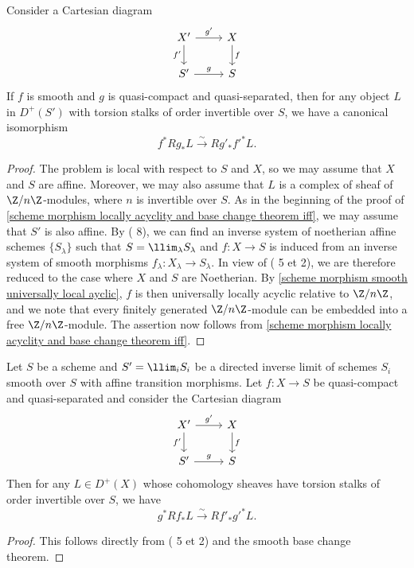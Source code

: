 \begin{theorem}
Consider a Cartesian diagram
\[\begin{tikzcd}
X'\ar[r,"g'"]\ar[d,swap,"f'"]&X\ar[d,"f"]\\
S'\ar[r,"g"]&S
\end{tikzcd}\]
If $f$ is smooth and $g$ is quasi-compact and quasi-separated, then for any object $L$ in $D^+(S')$ with torsion stalks of order invertible over $S$, we have a canonical isomorphism
\[f^*Rg_*L\stackrel{\sim}{\to} Rg'_*f'^*L.\]
\end{theorem}
\begin{proof}
The problem is local with respect to $S$ and $X$, so we may assume that $X$ and $S$ are affine. Moreover, we may also assume that $L$ is a complex of sheaf of $\Z/n\Z$-modules, where $n$ is invertible over $S$. As in the beginning of the proof of \cref{scheme morphism locally acyclity and base change theorem iff}, we may assume that $S'$ is also affine. By (\cite{EGA4-3} 8), we can find an inverse system of noetherian affine schemes $\{S_\lambda\}$ such that $S=\llim_\lambda S_\lambda$ and $f:X\to S$ is induced from an inverse system of smooth morphisms $f_\lambda:X_\lambda\to S_\lambda$. In view of (\cite{SGA4-2}  5 et  2), we are therefore reduced to the case where $X$ and $S$ are Noetherian. By \cref{scheme morphism smooth universally local ayclic}, $f$ is then universally locally acyclic relative to $\Z/n\Z$, and we note that every finitely generated $\Z/n\Z$-module can be embedded into a free $\Z/n\Z$-module. The assertion now follows from \cref{scheme morphism locally acyclity and base change theorem iff}.
\end{proof}

\begin{corollary}\label{scheme direct limit of smooth scheme base change}
Let $S$ be a scheme and $S'=\llim_iS_i$ be a directed inverse limit of schemes $S_i$ smooth over $S$ with affine transition morphisms. Let $f:X\to S$ be quasi-compact and quasi-separated and consider the Cartesian diagram
\[\begin{tikzcd}
X'\ar[r,"g'"]\ar[d,swap,"f'"]&X\ar[d,"f"]\\
S'\ar[r,"g"]&S
\end{tikzcd}\]
Then for any $L\in D^+(X)$ whose cohomology sheaves have torsion stalks of order invertible over $S$, we have
\[g^*Rf_*L\stackrel{\sim}{\to} Rf'_*g'^*L.\]
\end{corollary}
\begin{proof}
This follows directly from (\cite{SGA4-2}  5 et  2) and the smooth base change theorem.
\end{proof}

